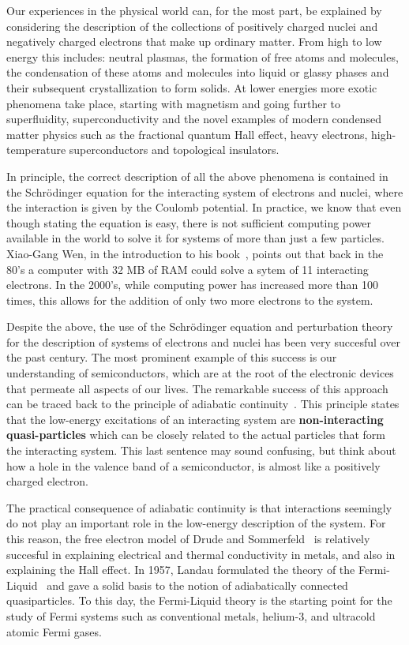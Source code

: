 \documentclass[oneside,11pt]{memoir}
\begin{document}
Our experiences in the physical world can, for the most part, be explained by
considering the description of the collections of positively charged nuclei and
negatively charged electrons that make up ordinary matter.    From high to low
energy this includes: neutral plasmas,  the formation of free atoms and
molecules, the condensation of these atoms and molecules into liquid or glassy
phases and their subsequent crystallization to form solids.   At lower energies
more exotic phenomena take place, starting with magnetism and going further to
superfluidity, superconductivity and the novel examples of modern condensed
matter physics such as the fractional quantum Hall effect, heavy electrons,
high-temperature superconductors and topological insulators.

In principle,  the correct description of all the above phenomena is contained
in the Schr\"{o}dinger equation for the interacting system of electrons and
nuclei,  where the interaction is given by the Coulomb potential. In practice,
we know that even though stating the equation is easy, there is not sufficient
computing power available in the world to solve it for systems of more than
just a few particles.  Xiao-Gang Wen, in the introduction to his
book~\cite{wen2004quantum}, points out that back in the 80's a computer with 32
MB of RAM could solve a sytem of 11 interacting electrons.  In the 2000's,
while computing power has increased more than 100 times, this allows for the
addition of only two more electrons to the system.  

Despite the above,  the use of the Schr\"{o}dinger equation and perturbation
theory for the description of  systems of electrons and nuclei has been very
succesful over the past century.  The most prominent example of this success is
our understanding of semiconductors, which are at the root of the electronic
devices that permeate all aspects of our lives.  The remarkable success of this
approach can be traced back to the principle of adiabatic
continuity~\cite{altland2010condensed}. This principle  states that  the
low-energy excitations of an interacting system  are  \textbf{non-interacting
quasi-particles} which can be closely related to the actual particles that form
the interacting system.   This last sentence may sound confusing, but think
about how a hole in the valence band of a semiconductor, is almost like a
positively charged electron.  

The practical consequence of adiabatic continuity
is that interactions seemingly do not play an important role in the low-energy
description of the system.  For this reason, the free electron model of Drude
and Sommerfeld~\cite{ashcroft1976solid} is relatively succesful in explaining
electrical and thermal conductivity in metals,  and also in explaining the Hall
effect.   In 1957, Landau formulated the theory of the
Fermi-Liquid~\cite{landau1965collected} and gave a solid basis to the notion of
adiabatically connected quasiparticles.  To this day, the Fermi-Liquid theory
is the starting point for the study of Fermi systems such as conventional
metals, helium-3, and ultracold atomic Fermi gases.   
\end{document}

